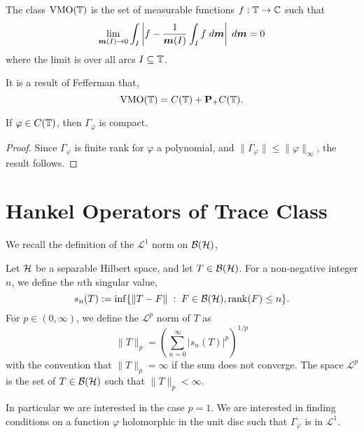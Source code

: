 \begin{proposition}
\label{feffVMO}
    The class $\operatorname{VMO}(\mathbb{T})$ is the set of measurable functions $f:\mathbb{T}\rightarrow\mathbb{C}$
    such that
    \begin{equation*}
        \lim_{\boldsymbol{m}(I)\rightarrow0} \int_I \left|f-\frac{1}{\boldsymbol{m}(I)}\int_I f\;d\boldsymbol{m}\right|\;d\boldsymbol{m} = 0
    \end{equation*}
    where the limit is over all arcs $I \subseteq \mathbb{T}$. 
    
    It is a result of Fefferman \cite{Garnett} that,
    \begin{equation*}
        \operatorname{VMO}(\mathbb{T}) = C(\mathbb{T})+\mathbf{P}_+C(\mathbb{T}).
    \end{equation*}
\end{proposition}   

\begin{corollary}
    If $\varphi \in C(\mathbb{T})$, then $\Gamma_\varphi$ is compact.
\end{corollary}
\begin{proof}
    Since $\Gamma_\varphi$ is finite rank for $\varphi$ a polynomial,
    and $\|\Gamma_\varphi\| \leq \|\varphi\|_\infty$, the result follows.
\end{proof} 

\section{Hankel Operators of Trace Class}
We recall the definition of the $\mathcal{L}^1$ norm on $\mathcal{B}(\mathcal{H})$,
\begin{definition}
    Let $\mathcal{H}$ be a separable Hilbert space, and let $T \in \mathcal{B}(\mathcal{H})$. 
    For a non-negative integer $n$, we define the $n$th singular value,
    \begin{equation*}
        s_n(T) := \inf\{\|T-F\| \;:\;F \in \mathcal{B}(\mathcal{H}),\operatorname{rank}(F) \leq n\}.
    \end{equation*}
    For $p \in (0,\infty)$, we define the $\mathcal{L}^p$ norm of $T$
    as
    \begin{equation*}
        \|T\|_p = \left(\sum_{n=0}^\infty |s_n(T)|^p\right)^{1/p}
    \end{equation*}
    with the convention that $\|T\|_p = \infty$ if the sum does not
    converge. The space $\mathcal{L}^p$ is the set of $T \in \mathcal{B}(\mathcal{H})$
    such that $\|T\|_p < \infty$.
\end{definition}



In particular we are interested in the case $p = 1$. We are interested
in finding conditions on a function $\varphi$ holomorphic in the unit disc
such that $\Gamma_\varphi$ is in $\mathcal{L}^1$. 


